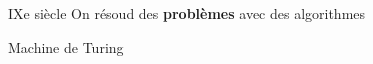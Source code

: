 \begin{frame}{IXe siècle}
    On résoud des \textbf{problèmes} avec des algorithmes
\end{frame}

\begin{frame}{Machine de Turing}
\end{frame}
